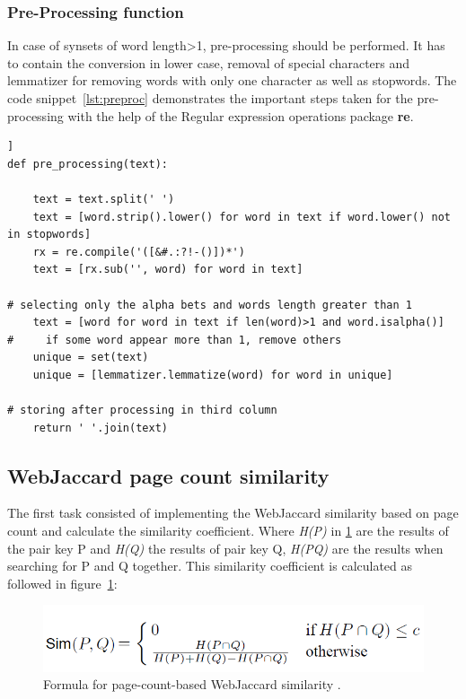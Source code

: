 \documentclass[conference]{IEEEtran}
\begin{document}
\subsubsection{Pre-Processing function}\label{sec:preproc}

In case of synsets of word length>1,  pre-processing should be performed. It has to contain the conversion in lower case, removal of special characters and lemmatizer for removing words with only one character as well as stopwords. The code snippet~\ref{lst:preproc} demonstrates the important steps taken for the pre-processing with the help of the Regular expression operations package \textbf{re}.

\begin{lstlisting}[frame=single, label=lst:preproc, caption={Pre-processing for synsets of word length>1}, captionpos=b]]
def pre_processing(text):

    text = text.split(' ')
    text = [word.strip().lower() for word in text if word.lower() not in stopwords]
    rx = re.compile('([&#.:?!-()])*')
    text = [rx.sub('', word) for word in text]
    
# selecting only the alpha bets and words length greater than 1
    text = [word for word in text if len(word)>1 and word.isalpha()]
#     if some word appear more than 1, remove others
    unique = set(text)
    unique = [lemmatizer.lemmatize(word) for word in unique]
    
# storing after processing in third column
    return ' '.join(text)
\end{lstlisting}

\subsection{WebJaccard page count similarity}\label{subsec:webjac}

The first task consisted of implementing the WebJaccard similarity based on page count and calculate the similarity coefficient. Where \textit{H(P)} in \ref{fig:pagecount} are the results of the pair key P and \textit{H(Q)} the results of pair key Q, \textit{H(PQ)} are the results when searching for P and Q together. This similarity coefficient  is calculated as followed in figure~\ref{fig:pagecount}:

\begin{figure}[h]
\centerline{\includegraphics[scale=0.6]{img/pagecount.png}}
\caption{Formula for page-count-based WebJaccard similarity \cite{websim}.}
\label{fig:pagecount}
\end{figure}
\end{document}
